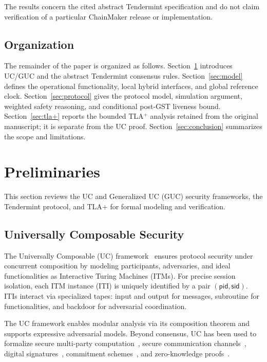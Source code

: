 \documentclass[conference,letterpaper,10pt]{IEEEtran}
\begin{document}
The results concern the cited abstract Tendermint specification and do not claim verification of a particular ChainMaker release or implementation.

\subsection{Organization} \label{sec:organization}

The remainder of the paper is organized as follows. Section~\ref{sec:preliminaries} introduces UC/GUC and the abstract Tendermint consensus rules. Section~\ref{sec:model} defines the operational functionality, local hybrid interfaces, and global reference clock. Section~\ref{sec:protocol} gives the protocol model, simulation argument, weighted safety reasoning, and conditional post-GST liveness bound. Section~\ref{sec:tla+} reports the bounded TLA$^+$ analysis retained from the original manuscript; it is separate from the UC proof. Section~\ref{sec:conclusion} summarizes the scope and limitations.

\section{Preliminaries}\label{sec:preliminaries}

This section reviews the UC and Generalized UC (GUC) security frameworks, the Tendermint protocol, and TLA+ for formal modeling and verification.

\subsection{Universally Composable Security}

The Universally Composable (UC) framework~\cite{canetti2001universally} ensures protocol security under concurrent composition by modeling participants, adversaries, and ideal functionalities as Interactive Turing Machines (ITMs). For precise session isolation, each ITM instance (ITI) is uniquely identified by a pair $(\mathsf{pid}, \mathsf{sid})$. ITIs interact via specialized tapes: input and output for messages, subroutine for functionalities, and backdoor for adversarial coordination.

The UC framework enables modular analysis via its composition theorem and supports expressive adversarial models. Beyond consensus, UC has been used to formalize secure multi-party computation~\cite{canetti2002universally}, secure communication channels~\cite{canetti2002universallykeyexchange}, digital signatures~\cite{canetti2004universally}, commitment schemes~\cite{canetti2001universallycommitments}, and zero-knowledge proofs~\cite{camenisch2011framework}.
\end{document}
